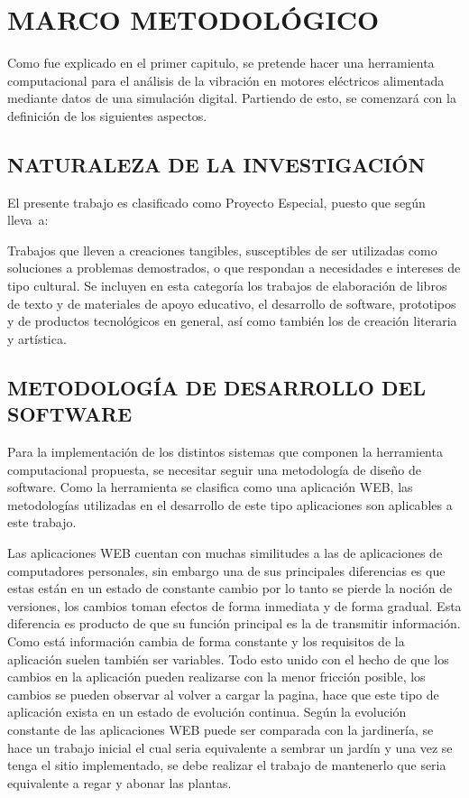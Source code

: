 \thispagestyle{empty}

\section{MARCO METODOLÓGICO}

Como fue explicado en el primer capitulo, se pretende hacer una herramienta
computacional para el análisis de la vibración en motores eléctricos alimentada
mediante datos de una simulación digital. Partiendo de esto, se comenzará
con la definición de los siguientes aspectos.

\subsection{NATURALEZA DE LA INVESTIGACIÓN}

El presente trabajo es clasificado como Proyecto Especial, puesto que según
\textcite{Hernandez} lleva~a:

\begin{center}
    \parbox[ht]{13.5 cm}{Trabajos que lleven a creaciones tangibles,
    susceptibles de ser utilizadas como soluciones a problemas demostrados, o
    que respondan a necesidades e intereses de tipo cultural. Se incluyen en
    esta categoría los trabajos de elaboración de libros de texto y de
    materiales de apoyo educativo, el desarrollo de software, prototipos y de
    productos tecnológicos en general, así como también los de creación
    literaria y artística.}
\end{center}

\subsection*{METODOLOGÍA DE DESARROLLO DEL SOFTWARE}

Para la implementación de los distintos sistemas que componen la herramienta
computacional propuesta, se necesitar seguir una metodología de diseño de
software. Como la herramienta se clasifica como una aplicación WEB, las
metodologías utilizadas en el desarrollo de este tipo aplicaciones son
aplicables a este trabajo.

Las aplicaciones WEB cuentan con muchas similitudes a las de aplicaciones de
computadores personales, sin embargo una de sus principales diferencias es que
estas están en un estado de constante cambio por lo tanto
se pierde la noción de versiones, los cambios toman efectos de forma inmediata
y de forma gradual. Esta diferencia es producto de que su función principal es
la de transmitir información. Como está información cambia de forma constante y
los requisitos de la aplicación suelen también ser variables. Todo esto unido
con el hecho de que los cambios en la aplicación pueden realizarse con la
menor fricción posible, los cambios se pueden observar al volver a cargar la
pagina, hace que este tipo de aplicación  exista en un estado de evolución
continua. Según \cite{pressman2002} la evolución constante de las aplicaciones
WEB puede ser comparada con la jardinería, se hace un trabajo inicial el cual
seria equivalente a sembrar un jardín y una vez se tenga el sitio implementado,
se debe realizar el trabajo de mantenerlo que seria equivalente a regar y
abonar las plantas.

